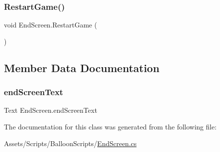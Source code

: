 \mbox{\label{classEndScreen_a3c4a935e0f51b7853611616db8f766a8}} 
\subsubsection{\texorpdfstring{Restart\+Game()}{RestartGame()}}
{\footnotesize\ttfamily void End\+Screen.\+Restart\+Game (\begin{DoxyParamCaption}{ }\end{DoxyParamCaption})\hspace{0.3cm}{\ttfamily [inline]}}



\subsection{Member Data Documentation}
\mbox{\label{classEndScreen_a67d4865ee98044882c46d771962e7eb8}} 
\subsubsection{\texorpdfstring{end\+Screen\+Text}{endScreenText}}
{\footnotesize\ttfamily Text End\+Screen.\+end\+Screen\+Text}



The documentation for this class was generated from the following file\+:\begin{DoxyCompactItemize}
\item 
Assets/\+Scripts/\+Balloon\+Scripts/\hyperlink{EndScreen_8cs}{End\+Screen.\+cs}\end{DoxyCompactItemize}

